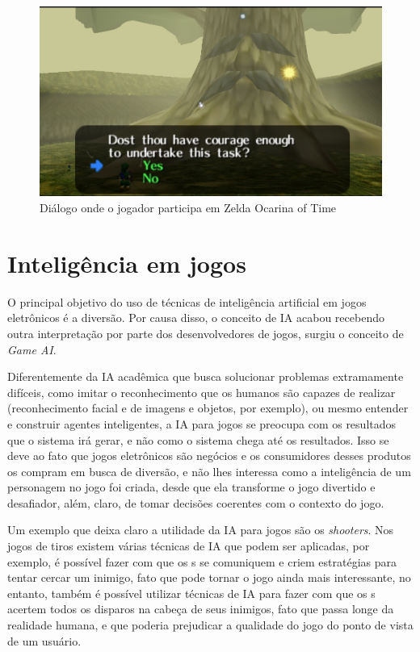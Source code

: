 \begin{figure}
\centering
\includegraphics [width=\textwidth]{figuras/exemplo_dialogo_zelda.jpg}
\caption{Diálogo onde o jogador participa em Zelda Ocarina of Time}
\label{zelda}
\end{figure}



\section{Inteligência em jogos}

O principal objetivo do uso de técnicas de inteligência artificial em jogos eletrônicos é a diversão. Por causa disso, o conceito de IA acabou recebendo outra interpretação por parte dos desenvolvedores de jogos, surgiu o conceito de \textit{Game AI}.

Diferentemente da IA acadêmica que busca solucionar problemas extramamente difíceis, como imitar o reconhecimento que os humanos são capazes de realizar (reconhecimento facial e de imagens e objetos, por exemplo), ou mesmo entender e construir agentes inteligentes, a IA para jogos se preocupa com os resultados que o sistema irá gerar, e não como o sistema chega até os resultados. Isso se deve ao fato que jogos eletrônicos são negócios e os consumidores desses produtos os compram em busca de diversão, e não lhes interessa como a inteligência de um personagem no jogo foi criada, desde que ela transforme o jogo divertido e desafiador, além, claro, de tomar decisões coerentes com o contexto do jogo.

Um exemplo que deixa claro a utilidade da IA para jogos são os \textit{shooters}. Nos jogos de tiros existem várias técnicas de IA que podem ser aplicadas, por exemplo, é possível fazer com que os \npc{}s se comuniquem e criem estratégias para tentar cercar um inimigo, fato que pode tornar o jogo ainda mais interessante, no entanto, também é possível utilizar técnicas de IA para fazer com que os \npc{}s acertem todos os disparos na cabeça de seus inimigos, fato que passa longe da realidade humana, e que poderia prejudicar a qualidade do jogo do ponto de vista de um usuário.

